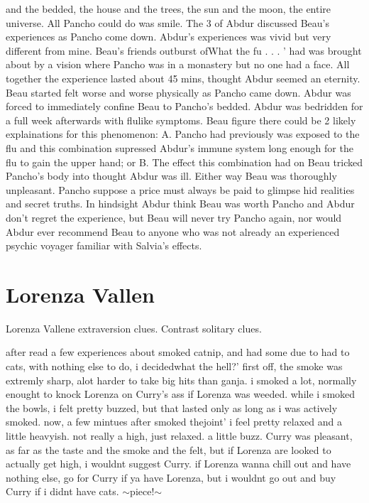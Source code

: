\documentclass[12pt]{book}
\begin{document}
and the bedded, the house and the trees, the sun and the moon, the entire universe. All Pancho could do was smile. The 3 of Abdur discussed Beau's experiences as Pancho come down. Abdur's experiences was vivid but very different from mine. Beau's friends outburst ofWhat the fu . . .  ' had was brought about by a vision where Pancho was in a monastery but no one had a face. All together the experience lasted about 45 mins, thought Abdur seemed an eternity. Beau started felt worse and worse physically as Pancho came down. Abdur was forced to immediately confine Beau to Pancho's bedded. Abdur was bedridden for a full week afterwards with flulike symptoms. Beau figure there could be 2 likely explainations for this phenomenon: A. Pancho had previously was exposed to the flu and this combination supressed Abdur's immune system long enough for the flu to gain the upper hand; or B. The effect this combination had on Beau tricked Pancho's body into thought Abdur was ill. Either way Beau was thoroughly unpleasant. Pancho suppose a price must always be paid to glimpse hid realities and secret truths. In hindsight Abdur think Beau was worth Pancho and Abdur don't regret the experience, but Beau will never try Pancho again, nor would Abdur ever recommend Beau to anyone who was not already an experienced psychic voyager familiar with Salvia's effects.



\chapter{Lorenza Vallen}

Lorenza Vallene extraversion clues. Contrast solitary clues.



after read a few experiences about smoked catnip, and had some due to had to cats, with nothing else to do, i decidedwhat the hell?' first off, the smoke was extremly sharp, alot harder to take big hits than ganja. i smoked a lot, normally enought to knock Lorenza on Curry's ass if Lorenza was weeded. while i smoked the bowls, i felt pretty buzzed, but that lasted only as long as i was actively smoked. now, a few mintues after smoked thejoint' i feel pretty relaxed and a little heavyish. not really a high, just relaxed. a little buzz. Curry was pleasant, as far as the taste and the smoke and the felt, but if Lorenza are looked to actually get high, i wouldnt suggest Curry. if Lorenza wanna chill out and have nothing else, go for Curry if ya have Lorenza, but i wouldnt go out and buy Curry if i didnt have cats. $\sim$piece!$\sim$
\end{document}
